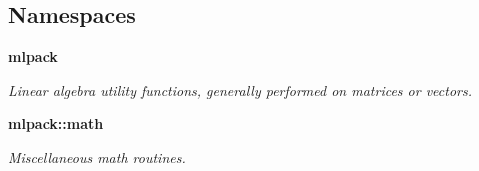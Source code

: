 \subsection*{Namespaces}
\begin{DoxyCompactItemize}
\item 
 \textbf{ mlpack}
\begin{DoxyCompactList}\small\item\em Linear algebra utility functions, generally performed on matrices or vectors. \end{DoxyCompactList}\item 
 \textbf{ mlpack\+::math}
\begin{DoxyCompactList}\small\item\em Miscellaneous math routines. \end{DoxyCompactList}\end{DoxyCompactItemize}
